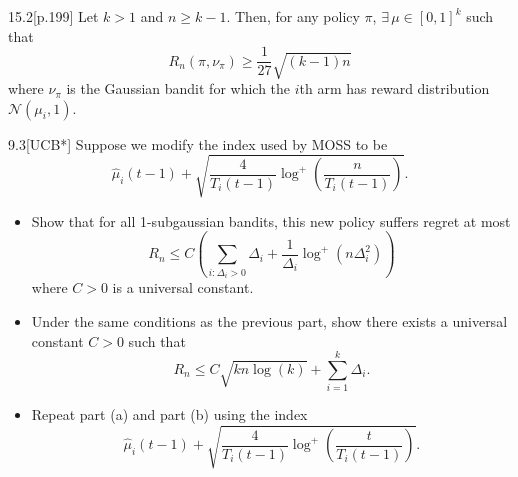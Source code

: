 \documentclass[10pt]{article}
\newenvironment{theorem*}[1]{%
  \IfBlankTF{#1}
    {\renewcommand{\themanualtheoreminner}{\unskip}}
    {\renewcommand\themanualtheoreminner{#1}}%
  \manualtheoreminner
}{\endmanualtheoreminner}
\theoremstyle{definition}
\newenvironment{exercise*}[1]{%
  \IfBlankTF{#1}
    {\renewcommand{\themanualexerciseinner}{\unskip}}
    {\renewcommand\themanualexerciseinner{#1}}%
  \manualexerciseinner
}{\endmanualexerciseinner}
\begin{document}
\begin{theorem*}{15.2}[p.199]
    Let $k > 1$ and $n \geq k-1$. Then, for any policy $\pi$, $\exists \, \mu \in [0,1]^k$ such that
    \begin{equation*}
        R_n (\pi, \nu_\pi) \geq \frac{1}{27} \sqrt{(k-1)n}
    \end{equation*}
    where $\nu_\pi$ is the Gaussian bandit for which the $i$th arm has reward distribution $\mathcal{N}(\mu_i , 1)$.
\end{theorem*}

\begin{exercise*}{9.3}[UCB*]
    Suppose we modify the index used by MOSS to be
    \begin{equation*}
        \hat{\mu}_i (t-1)+ \sqrt{\frac{4}{T_i (t-1)} \log^+ \left(\frac{n}{T_i (t-1)}\right)}.
    \end{equation*}
    \begin{itemize}
        \item[(a)] Show that for all 1-subgaussian bandits, this new policy suffers regret at most
        \begin{equation*}
            R_n \leq C \left( \sum_{i : \Delta_i > 0} \Delta_i + \frac{1}{\Delta_i} \log^+ (n \Delta_i^2) \right)
        \end{equation*}
        where $C > 0$ is a universal constant.
        \item[(b)] Under the same conditions as the previous part, show there exists a universal constant $C > 0$ such that
        \begin{equation*}
            R_n \leq C \sqrt{kn \log(k)} + \sum_{i=1}^k \Delta_i.
        \end{equation*}
        \item[(c)] Repeat part (a) and part (b) using the index
        \begin{equation*}
            \hat{\mu}_i (t-1) + \sqrt{\frac{4}{T_i (t-1)} \log^+ \left(\frac{t}{T_i (t-1)}\right)}.
        \end{equation*}
    \end{itemize}
\end{exercise*}
\end{document}
